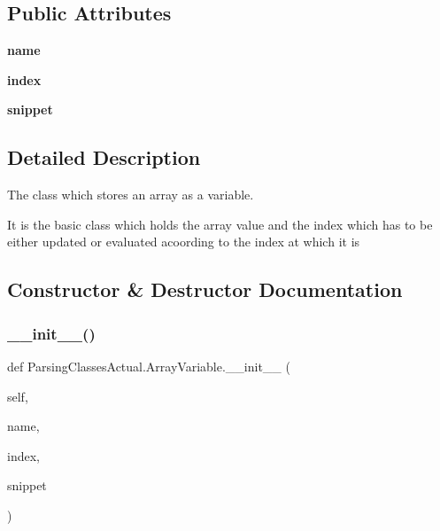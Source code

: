 \subsection*{Public Attributes}
\begin{DoxyCompactItemize}
\item 
\mbox{\label{class_parsing_classes_actual_1_1_array_variable_a3d0632bea1f9f74b92f931cb941d06e7}} 
{\bfseries name}
\item 
\mbox{\label{class_parsing_classes_actual_1_1_array_variable_aa7cb30aa9447d819a00fa9ab2ce973d3}} 
{\bfseries index}
\item 
\mbox{\label{class_parsing_classes_actual_1_1_array_variable_aba5a945c50e696863b1bd4a68efb3b7f}} 
{\bfseries snippet}
\end{DoxyCompactItemize}


\subsection{Detailed Description}
The class which stores an array as a variable. 

It is the basic class which holds the array value and the index which has to be either updated or evaluated acoording to the index at which it is 

\subsection{Constructor \& Destructor Documentation}
\mbox{\label{class_parsing_classes_actual_1_1_array_variable_a8d1f844a7bd0c87083039e7d40c5d882}} 
\subsubsection{\texorpdfstring{\+\_\+\+\_\+init\+\_\+\+\_\+()}{\_\_init\_\_()}}
{\footnotesize\ttfamily def Parsing\+Classes\+Actual.\+Array\+Variable.\+\_\+\+\_\+init\+\_\+\+\_\+ (\begin{DoxyParamCaption}\item[{}]{self,  }\item[{}]{name,  }\item[{}]{index,  }\item[{}]{snippet }\end{DoxyParamCaption})}



